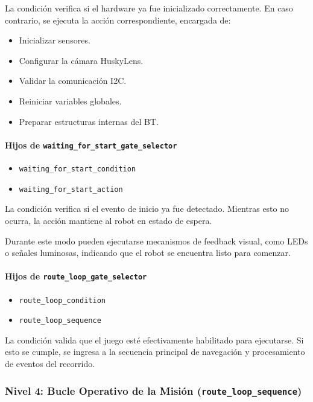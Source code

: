 \documentclass{prgrado}
\begin{document}
La condición verifica si el hardware ya fue inicializado correctamente. En caso contrario, se ejecuta la acción correspondiente, encargada de:

\begin{itemize}
    \item Inicializar sensores.
    \item Configurar la cámara HuskyLens.
    \item Validar la comunicación I2C.
    \item Reiniciar variables globales.
    \item Preparar estructuras internas del BT.
\end{itemize}

\paragraph{Hijos de \texttt{waiting\_for\_start\_gate\_selector}}

\begin{itemize}
    \item \texttt{waiting\_for\_start\_condition}
    \item \texttt{waiting\_for\_start\_action}
\end{itemize}

La condición verifica si el evento de inicio ya fue detectado. Mientras esto no ocurra, la acción mantiene al robot en estado de espera.

Durante este modo pueden ejecutarse mecanismos de feedback visual, como LEDs o señales luminosas, indicando que el robot se encuentra listo para comenzar.

\paragraph{Hijos de \texttt{route\_loop\_gate\_selector}}

\begin{itemize}
    \item \texttt{route\_loop\_condition}
    \item \texttt{route\_loop\_sequence}
\end{itemize}

La condición valida que el juego esté efectivamente habilitado para ejecutarse. Si esto se cumple, se ingresa a la secuencia principal de navegación y procesamiento de eventos del recorrido.

\subsubsection{Nivel 4: Bucle Operativo de la Misión (\texttt{route\_loop\_sequence})}
\end{document}
